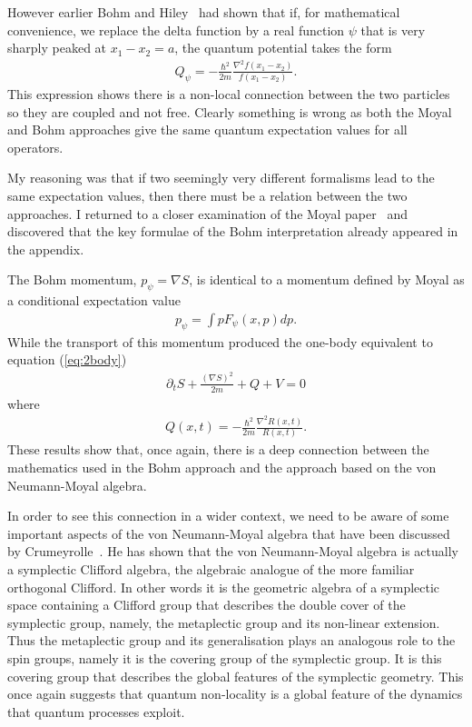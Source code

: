 \documentclass[11pt]{article}
\begin{document}
 However earlier Bohm and Hiley~\cite{dbbh75} 
had shown that if, for mathematical convenience, we replace the delta function by a real function $\psi$ that is very sharply peaked at $x_1-x_2=a$, the  quantum potential  takes the form
\begin{eqnarray*}
Q_\psi=-\frac{\hbar^2}{2m}\frac{\nabla^2f(x_1-x_2)}{f(x_1-x_2)}.
\end{eqnarray*}
This expression shows there is a non-local connection between the two particles so they are coupled and not free. Clearly something is wrong as both the Moyal and Bohm approaches give the same quantum expectation values for all operators.

My reasoning was that if two seemingly very different formalisms lead to the same expectation values, then there must be a relation between the two approaches.  I returned to a closer examination of the Moyal paper~\cite{jm49} and discovered that the key formulae of the Bohm interpretation already appeared in the appendix.  

 The Bohm momentum, $p_\psi=\nabla S$, is identical to a momentum defined by Moyal as a conditional expectation value 
\begin{eqnarray}
p_\psi=\int pF_\psi(x,p)dp.
\end{eqnarray}
While the transport of this momentum produced the one-body equivalent to equation (\ref{eq:2body})
\begin{eqnarray}
\partial_t S+\frac{(\nabla S)^2}{2m} + Q+V=0		\label{eq:1body}
\end{eqnarray}
where\begin{eqnarray}
Q(x, t)=-\frac{\hbar^2}{2m}\frac{\nabla^2R(x,t)}{R(x,t)}. \label{eq:1QPE}
\end{eqnarray}
These results show that, once again, there is a deep connection between the mathematics used in the Bohm approach and  the approach based on the von Neumann-Moyal algebra. 

In order to see this connection in a wider context,  we need to be aware of some important aspects of the von Neumann-Moyal algebra that have been discussed by Crumeyrolle~\cite{ac90}.  He 
has shown that the von Neumann-Moyal algebra is actually a symplectic Clifford algebra, the algebraic analogue of the more familiar orthogonal Clifford. In other words it is the geometric algebra of a symplectic space containing a Clifford group that describes the double cover of the symplectic group, namely,  the metaplectic group and its non-linear extension.  Thus the metaplectic group and its generalisation plays an analogous role to the spin groups, namely it is the covering group of the symplectic group.  It is this covering group that describes the global features of the symplectic geometry.  This once again suggests that quantum non-locality is a global feature of the dynamics that quantum processes exploit.
\end{document}
